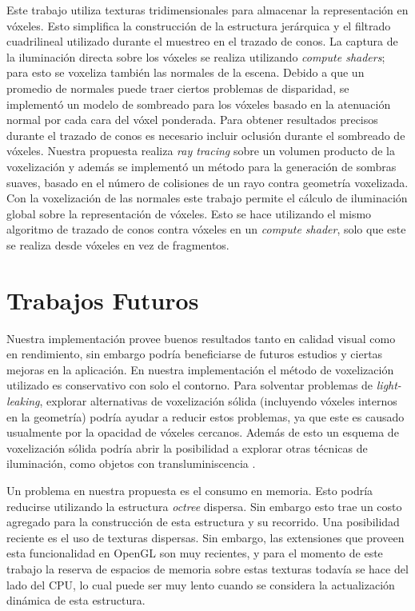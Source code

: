 Este trabajo utiliza texturas tridimensionales para almacenar la representación en vóxeles. Esto simplifica la construcción de la estructura jerárquica y el filtrado cuadrilineal utilizado durante el muestreo en el trazado de conos. La captura de la iluminación directa sobre los vóxeles se realiza utilizando \emph{compute shaders}; para esto se voxeliza también las normales de la escena. Debido a que un promedio de normales puede traer ciertos problemas de disparidad, se implementó un modelo de sombreado para los vóxeles basado en la atenuación normal por cada cara del vóxel ponderada. Para obtener resultados precisos durante el trazado de conos es necesario incluir oclusión durante el sombreado de vóxeles. Nuestra propuesta realiza \emph{ray tracing} sobre un volumen producto de la voxelización y además se implementó un método para la generación de sombras suaves, basado en el número de colisiones de un rayo contra geometría voxelizada. Con la voxelización de las normales este trabajo permite el cálculo de iluminación global sobre la representación de vóxeles. Esto se hace utilizando el mismo algoritmo de trazado de conos contra vóxeles en un \emph{compute shader}, solo que este se realiza desde vóxeles en vez de fragmentos.

\section{Trabajos Futuros} %
\label{sec:trabajos_futuros}
Nuestra implementación provee buenos resultados tanto en calidad visual como en rendimiento, sin embargo podría beneficiarse de futuros estudios y ciertas mejoras en la aplicación. En nuestra implementación el método de voxelización utilizado es conservativo con solo el contorno. Para solventar problemas de \emph{light-leaking}, explorar alternativas de voxelización sólida (incluyendo vóxeles internos en la geometría) podría ayudar a reducir estos problemas, ya que este es causado usualmente por la opacidad de vóxeles cercanos. Además de esto un esquema de voxelización sólida podría abrir la posibilidad a explorar otras técnicas de iluminación, como objetos con transluminiscencia \cite{Eisemann:2008:SGS:1375714.1375728}.

Un problema en nuestra propuesta es el consumo en memoria. Esto podría reducirse utilizando la estructura \emph{octree} dispersa. Sin embargo esto trae un costo agregado para la construcción de esta estructura y su recorrido. Una posibilidad reciente es el uso de texturas dispersas. Sin embargo, las extensiones que proveen esta funcionalidad en OpenGL son muy recientes, y para el momento de este trabajo la reserva de espacios de memoria sobre estas texturas todavía se hace del lado del CPU, lo cual puede ser muy lento cuando se considera la actualización dinámica de esta estructura.

